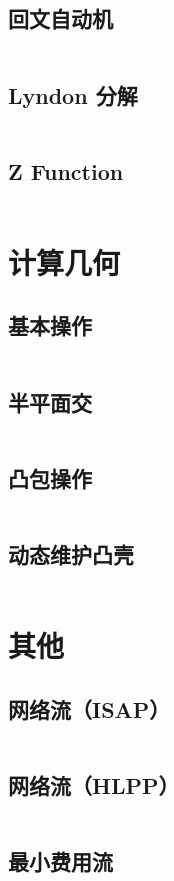 \documentclass[a4paper,9]{article}
\begin{document}
\subsection{回文自动机}
\inputminted[breaklines]{c++}{string/pam.cpp}
\subsection{Lyndon 分解}
\inputminted[breaklines]{c++}{string/lyndon.cpp}
\subsection{Z Function}
\inputminted[breaklines]{c++}{string/z_func.cpp}

\section{计算几何}
\subsection{基本操作}
\inputminted[breaklines]{c++}{geometry/basic.cpp}
\subsection{半平面交}
\inputminted[breaklines]{c++}{geometry/half-plane-intersection.cpp}
\subsection{凸包操作}
\inputminted[breaklines]{c++}{geometry/convex.cpp}
\subsection{动态维护凸壳}
\inputminted[breaklines]{c++}{geometry/dynamic-convex.cpp}

\section{其他}
\subsection{网络流（ISAP）}
\inputminted[breaklines]{c++}{others/isap.cpp}
\subsection{网络流（HLPP）}
\inputminted[breaklines]{c++}{others/hlpp.cpp}
\subsection{最小费用流}
\inputminted[breaklines,breakanywhere]{c++}{others/mincost.cpp}
\end{document}
